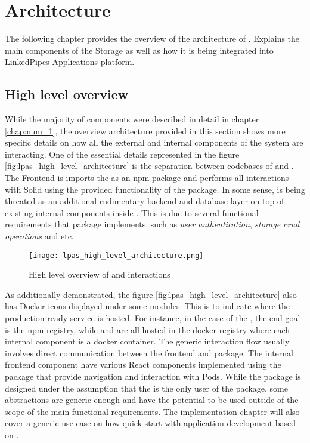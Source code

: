 \chapter{Architecture}
\label{chap:num_4}

The following chapter provides the overview of the architecture of \lpas. Explains the main components of the Storage as well as how it is being integrated into LinkedPipes Applications platform.

\section{High level overview}

While the majority of components were described in detail in chapter  \ref{chap:num_1}, the overview architecture provided in this section shows more specific details on how all the external and internal components of the system are interacting. One of the essential details represented in the figure \ref{fig:lpas_high_level_architecture} is the separation between codebases of \lpa{} and \lpas{}. The \lpa{} Frontend is imports the \lpas{} as an npm package and performs all interactions with Solid using the provided functionality of the package. In some sense, \lpas{} is being threated as an additional rudimentary backend and database layer on top of existing internal components inside \lpa{}. This is due to several functional requirements that \lpas{} package implements,  such as \textit{user authentication}, \textit{storage crud operations} and etc.

\begin{figure}[h]
\centering
\texttt{[image: lpas\_high\_level\_architecture.png]}
\caption{High level overview of \lpa{} and \lpas{} interactions}
\label{fig:lps_authentication_sequence_diagram.png}
\end{figure}

As additionally demonstrated, the figure \ref{fig:lpas_high_level_architecture} also has Docker icons displayed under some modules. This is to indicate where the production-ready service is hosted. For instance, in the case of the \lpas{}, the end goal is the npm registry, while \lps{} and \lpa{} are all hosted in the docker registry where each internal component is a docker container.
The generic interaction flow usually involves direct communication between the \lpa{} frontend and \lpas{} package. The internal frontend component have various React components implemented using the \lpas{} package that provide navigation and interaction with \solid{} Pods. While the package is designed under the assumption that the \lpa{} is the only user of the package, some abstractions are generic enough and have the potential to be used outside of the scope of the main functional requirements. The implementation chapter will also cover a generic use-case on how quick start with application development based on \solid{}.


